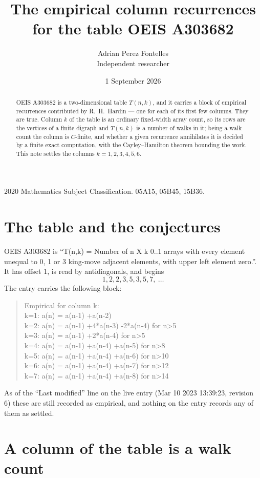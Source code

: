 \documentclass[11pt,a4paper]{article}
\title{The empirical column recurrences for the table OEIS A303682}
\author{Adrian Perez Fontelles\\ \small Independent researcher}
\date{1 September 2026}
\theoremstyle{plain}
\theoremstyle{definition}
\begin{document}
\maketitle

\begin{abstract}
OEIS A303682 is a two-dimensional table $T(n,k)$, and it carries a block of empirical
recurrences contributed by R.~H.~Hardin --- one for each of its first few columns. They are
true. Column $k$ of the table is an ordinary fixed-width array count, so its rows are the
vertices of a finite digraph and $T(n,k)$ is a number of walks in it; being a walk count the
column is $C$-finite, and whether a given recurrence annihilates it is decided by a finite
exact computation, with the Cayley--Hamilton theorem bounding the work. This note settles the columns $k=1, 2, 3, 4, 5, 6$.
\end{abstract}

\noindent\small 2020 Mathematics Subject Classification. 05A15, 05B45, 15B36.\normalsize

\section{The table and the conjectures}

OEIS A303682 is ``T(n,k) = Number of n X k 0..1 arrays with every element unequal to 0, 1 or 3 king-move adjacent elements, with upper left element zero.''. It has offset $1$, is
read by antidiagonals, and begins
\[
1, 2, 2, 3, 5, 3, 5, 7,\ \dots
\]
The entry carries the following block:
\begin{quote}\small
Empirical for column k:\\
k=1: a(n) = a(n-1) +a(n-2)\\
k=2: a(n) = a(n-1) +4*a(n-3) -2*a(n-4) for n>5\\
k=3: a(n) = a(n-1) +2*a(n-4) for n>5\\
k=4: a(n) = a(n-1) +a(n-4) +a(n-5) for n>8\\
k=5: a(n) = a(n-1) +a(n-4) +a(n-6) for n>10\\
k=6: a(n) = a(n-1) +a(n-4) +a(n-7) for n>12\\
k=7: a(n) = a(n-1) +a(n-4) +a(n-8) for n>14\\
\end{quote}
As of the ``Last modified'' line on the live entry (Mar 10 2023 13:39:23, revision 6) these are still
recorded as empirical, and nothing on the entry records any of them as settled.

\section{A column of the table is a walk count}
\end{document}
